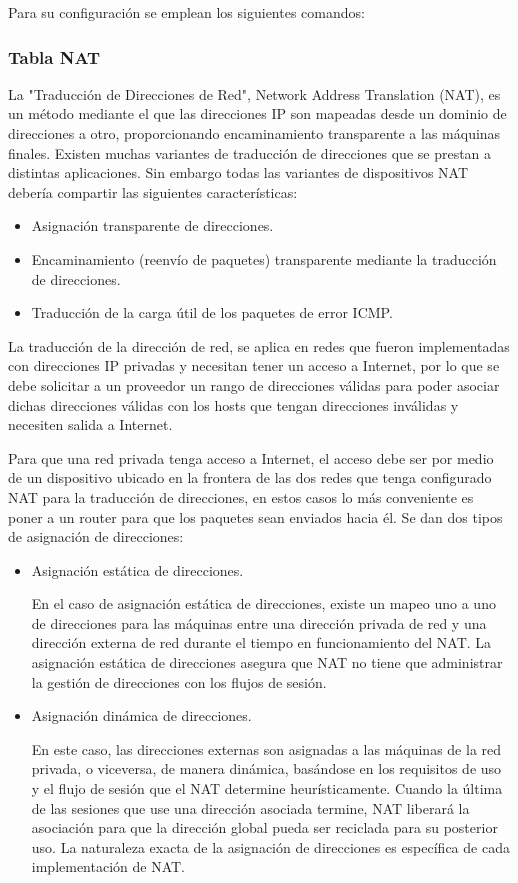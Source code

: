 \documentclass[a4paper,10pt]{article}
\begin{document}
Para su configuración se emplean los siguientes comandos:
\subsubsection{Tabla NAT}
La "Traducción de Direcciones de Red", Network Address Translation (NAT), es un método mediante el que las direcciones IP son mapeadas desde un dominio de direcciones a otro, proporcionando encaminamiento transparente a las máquinas finales. Existen muchas variantes de traducción de direcciones que se prestan a distintas aplicaciones. Sin embargo todas las variantes de dispositivos NAT debería compartir las siguientes características:
\begin{itemize}
 	\item Asignación transparente de direcciones.
    \item Encaminamiento (reenvío de paquetes) transparente mediante la traducción de direcciones.
    \item Traducción de la carga útil de los paquetes de error ICMP.
\end{itemize}

La traducción de la dirección de red, se aplica en redes que fueron implementadas con direcciones IP privadas y necesitan tener un acceso a Internet, por lo que se debe solicitar a un proveedor un rango de direcciones válidas para poder asociar dichas direcciones válidas con los hosts que tengan direcciones inválidas y necesiten salida a Internet.

Para que una red privada tenga acceso a Internet, el acceso debe ser por medio de un dispositivo ubicado en la frontera de las dos redes que tenga configurado NAT para la traducción de direcciones, en estos casos lo más conveniente es poner a un router para que los paquetes sean enviados hacia él. Se dan dos tipos de asignación de direcciones:
\begin{itemize}
	\item Asignación estática de direcciones.

En el caso de asignación estática de direcciones, existe un mapeo uno a uno de direcciones para las máquinas entre una dirección privada de red y una dirección externa de red durante el tiempo en funcionamiento del NAT. La asignación estática de direcciones asegura que NAT no tiene que administrar la gestión de direcciones con los flujos de sesión.

    \item Asignación dinámica de direcciones. 

En este caso, las direcciones externas son asignadas a las máquinas de la red privada, o viceversa, de manera dinámica, basándose en los requisitos de uso y el flujo de sesión que el NAT determine heurísticamente. Cuando la última de las sesiones que use una dirección asociada termine, NAT liberará la asociación para que la dirección global pueda ser reciclada para su posterior uso. La naturaleza exacta de la asignación de direcciones es específica de cada implementación de NAT.
\end{itemize}
\end{document}
